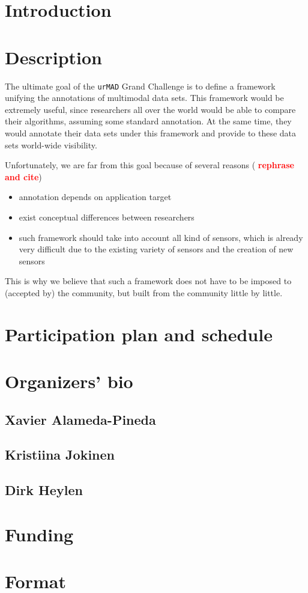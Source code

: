 \documentclass{sig-alternate}
\newcommand{\todo}[1]{ \textcolor{red}{\bf #1}}
\begin{document}
\section{Introduction}

\section{Description}
The ultimate goal of the \texttt{urMAD} Grand Challenge is to define a framework unifying the annotations of multimodal
data sets. This framework would be extremely useful, since researchers all over the world would be able
to compare their algorithms, assuming some standard annotation. At the same time, they would annotate their data sets
under this framework and provide to these data sets world-wide visibility.

Unfortunately, we are far from this goal because of several reasons (\todo{rephrase and cite})
\begin{itemize}
 \item annotation depends on application target
 \item exist conceptual differences between researchers
 \item such framework should take into account all kind of sensors, which is already very difficult due to the existing
variety of sensors and the creation of new sensors
\end{itemize}

This is why we believe that such a framework does not have to be imposed to (accepted by) the community, but built from
the community little by little.


\section{Participation plan and schedule}

\section{Organizers' bio}
\subsection{Xavier Alameda-Pineda}
\subsection{Kristiina Jokinen}
\subsection{Dirk Heylen}

\section{Funding}

\section{Format}
\end{document}
